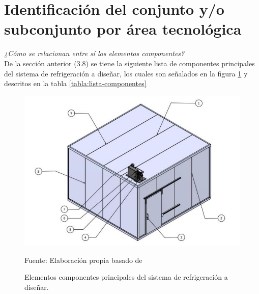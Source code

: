 

\newpage 


\section{Identificación del conjunto y/o subconjunto por área tecnológica} %
\textit{¿Cómo se relacionan entre sí los elementos componentes?}\\
De la sección anterior (3.8) se tiene la siguiente lista de componentes principales del sistema de refrigeración a diseñar, los cuales son señalados en la figura \ref{fig:listacomponentes} y descritos en la tabla \ref{tabla:lista-componentes}

\begin{figure}[H]
	\centering
	\includegraphics[width=0.6\linewidth]{figures/lista_componentes}
	\caption{Elementos componentes principales del sistema de refrigeración a diseñar.}Fuente: Elaboración propia basado de 
	\label{fig:listacomponentes}
\end{figure}

